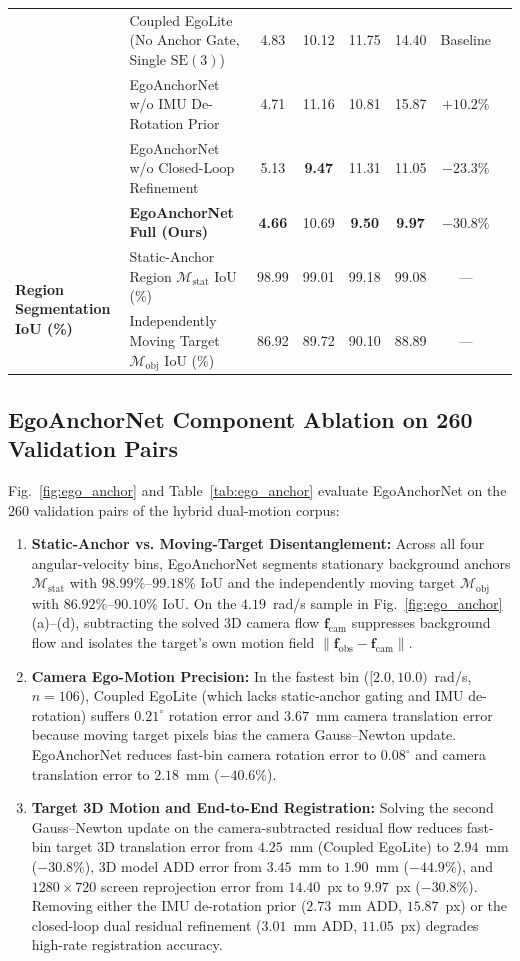 \documentclass[journal]{IEEEtran}
\begin{document}
\begin{table}[!t]
{\begin{tabular}{llcccccc}
 & Coupled EgoLite (No Anchor Gate, Single $\mathrm{SE}(3)$) & 4.83 & 10.12 & 11.75 & 14.40 & Baseline \\
 & EgoAnchorNet w/o IMU De-Rotation Prior & 4.71 & 11.16 & 10.81 & 15.87 & $+10.2\%$ \\
 & EgoAnchorNet w/o Closed-Loop Refinement & 5.13 & \textbf{9.47} & 11.31 & 11.05 & $-23.3\%$ \\
 & \textbf{EgoAnchorNet Full (Ours)} & \textbf{4.66} & 10.69 & \textbf{9.50} & \textbf{9.97} & \textbf{$-30.8\%$} \\
\midrule
\multirow{2}{*}{\textbf{Region Segmentation IoU (\%)}}
 & Static-Anchor Region $\mathcal{M}_{\text{stat}}$ IoU (\%) & 98.99 & 99.01 & 99.18 & 99.08 & --- \\
 & Independently Moving Target $\mathcal{M}_{\text{obj}}$ IoU (\%) & 86.92 & 89.72 & 90.10 & 88.89 & --- \\
\bottomrule
\end{tabular}%
}
\end{table}

\subsection{EgoAnchorNet Component Ablation on 260 Validation Pairs}
Fig.~\ref{fig:ego_anchor} and Table~\ref{tab:ego_anchor} evaluate EgoAnchorNet on the $260$ validation pairs of the hybrid dual-motion corpus:
\begin{enumerate}
    \item \textbf{Static-Anchor vs. Moving-Target Disentanglement:} Across all four angular-velocity bins, EgoAnchorNet segments stationary background anchors $\mathcal{M}_{\text{stat}}$ with $98.99\%\text{--}99.18\%$ IoU and the independently moving target $\mathcal{M}_{\text{obj}}$ with $86.92\%\text{--}90.10\%$ IoU. On the $4.19$~rad/s sample in Fig.~\ref{fig:ego_anchor}(a)--(d), subtracting the solved 3D camera flow $\mathbf{f}_{\text{cam}}$ suppresses background flow and isolates the target's own motion field $\|\mathbf{f}_{\text{obs}} - \mathbf{f}_{\text{cam}}\|$.
    \item \textbf{Camera Ego-Motion Precision:} In the fastest bin ($[2.0,10.0)$~rad/s, $n=106$), Coupled EgoLite (which lacks static-anchor gating and IMU de-rotation) suffers $0.21^\circ$ rotation error and $3.67$~mm camera translation error because moving target pixels bias the camera Gauss--Newton update. EgoAnchorNet reduces fast-bin camera rotation error to $0.08^\circ$ and camera translation error to $2.18$~mm ($-40.6\%$).
    \item \textbf{Target 3D Motion and End-to-End Registration:} Solving the second Gauss--Newton update on the camera-subtracted residual flow reduces fast-bin target 3D translation error from $4.25$~mm (Coupled EgoLite) to $2.94$~mm ($-30.8\%$), 3D model ADD error from $3.45$~mm to $1.90$~mm ($-44.9\%$), and $1280\times720$ screen reprojection error from $14.40$~px to $9.97$~px ($-30.8\%$). Removing either the IMU de-rotation prior ($2.73$~mm ADD, $15.87$~px) or the closed-loop dual residual refinement ($3.01$~mm ADD, $11.05$~px) degrades high-rate registration accuracy.
\end{enumerate}
\end{document}
